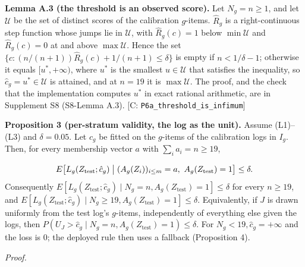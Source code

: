 \documentclass{ieeeaccess}
\begin{document}
\textbf{Lemma A.3 (the threshold is an observed score).} Let $N_{g} = n \geq 1$, and let $\mathcal{U}$ be the set of distinct scores of the calibration $g$-items. $\hat{R}_{g}$ is a right-continuous step function whose jumps lie in $\mathcal{U}$, with $\hat{R}_{g}(c) = 1$ below $\min \mathcal{U}$ and $\hat{R}_{g}(c) = 0$ at and above $\max \mathcal{U}$. Hence the set $\{c : (n/(n + 1))\hat{R}_{g}(c) + 1/(n + 1) \leq \delta\}$ is empty if $n < 1/\delta - 1$; otherwise it equals $[u^{*}, +\infty)$, where $u^{*}$ is the smallest $u \in \mathcal{U}$ that satisfies the inequality, so $\hat{c}_{g} = u^{*} \in \mathcal{U}$ is attained, and at $n = 19$ it is $\max \mathcal{U}$. The proof, and the check that the implementation computes $u^{*}$ in exact rational arithmetic, are in Supplement S8 (S8-Lemma A.3). [C: \texttt{P6a\_threshold\_is\_infimum}]

\textbf{Proposition 3 (per-stratum validity, the log as the unit).} Assume (L1)--(L3) and $\delta = 0.05$. Let $\hat{c}_{g}$ be fitted on the $g$-items of the calibration logs in $I_{g}$. Then, for every membership vector $a$ with $\sum_{i} a_{i} = n \geq 19$,

\begin{equation*}
E\bigl[L_g(Z_{\mathrm{test}}; \hat{c}_g) \bigm| (A_g(Z_i))_{i\leq m} = a,\ A_g(Z_{\mathrm{test}}) = 1\bigr] \leq \delta.
\end{equation*}
Consequently $E[L_{g}(Z_{\mathrm{test}}; \hat{c}_{g}) \mid N_{g} = n, A_{g}(Z_{\mathrm{test}}) = 1] \leq \delta$ for every $n \geq 19$, and $E[L_{g}(Z_{\mathrm{test}}; \hat{c}_{g}) \mid N_{g} \geq 19, A_{g}(Z_{\mathrm{test}}) = 1] \leq \delta$. Equivalently, if $J$ is drawn uniformly from the test log's $g$-items, independently of everything else given the logs, then $P(U_{J} > \hat{c}_{g} \mid N_{g} = n, A_{g}(Z_{\mathrm{test}}) = 1) \leq \delta$. For $N_{g} < 19, \hat{c}_{g} = +\infty$ and the loss is 0; the deployed rule then uses a fallback (Proposition 4).

\emph{Proof.}
\end{document}
